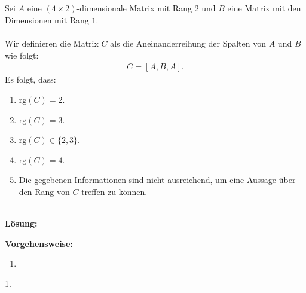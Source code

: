 \subsection*{}
Sei $ A $ eine $ (4 \times 2) $-dimensionale Matrix mit Rang $ 2 $ und $ B $ eine Matrix mit den Dimensionen mit Rang $ 1 $.\\
\\
Wir definieren die Matrix $ C $ als die Aneinanderreihung der Spalten von $ A $ und $ B $ wie folgt:
\begin{align*}
	C = [A, B, A].
\end{align*}
Es folgt, dass:
\renewcommand{\labelenumi}{(\alph{enumi})}
\begin{enumerate}
	\item 
	$ \mathrm{rg}(C) = 2 $.
	\item
	$ \mathrm{rg}(C) = 3 $.
	\item
	$ \mathrm{rg}(C)\in \{2,3\} $.
	\item
	$ \mathrm{rg}(C) = 4 $.
	\item
	Die gegebenen Informationen sind nicht ausreichend, um eine Aussage über den Rang von $ C $ treffen zu können.
\end{enumerate}
\ \\
\textbf{Lösung:}
\begin{mdframed}
	\underline{\textbf{Vorgehensweise:}}
	\renewcommand{\labelenumi}{\theenumi.}
	\begin{enumerate}
		\item 
	\end{enumerate}
\end{mdframed}

\underline{1. }\\



\newpage
